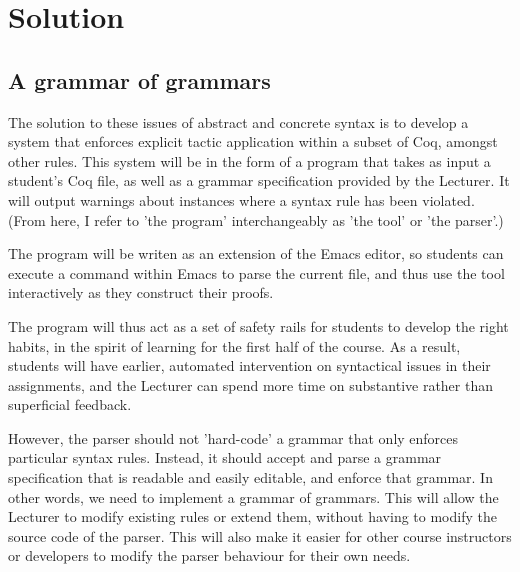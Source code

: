 
\chapter{Solution} %

\label{solution} %



\section{A grammar of grammars}
The solution to these issues of abstract and concrete syntax is to develop a system that enforces explicit tactic application within a subset of Coq, amongst other rules. This system will be in the form of a program that takes as input a student's Coq file, as well as a grammar specification provided by the Lecturer. It will output warnings about instances where a syntax rule has been violated. (From here, I refer to 'the program' interchangeably as 'the tool' or 'the parser'.)

The program will be writen as an extension of the Emacs editor, so students can execute a command within Emacs to parse the current file, and thus use the tool interactively as they construct their proofs. 

The program will thus act as a set of safety rails for students to develop the right habits, in the spirit of learning for the first half of the course. As a result, students will have earlier, automated intervention on syntactical issues in their assignments, and the Lecturer can spend more time on substantive rather than superficial feedback. 

However, the parser should not 'hard-code' a grammar that only enforces particular syntax rules. Instead, it should accept and parse a grammar specification that is readable and easily editable, and enforce that grammar. In other words, we need to implement a grammar of grammars. This will allow the Lecturer to modify existing rules or extend them, without having to modify the source code of the parser. This will also make it easier for other course instructors or developers to modify the parser behaviour for their own needs. 

